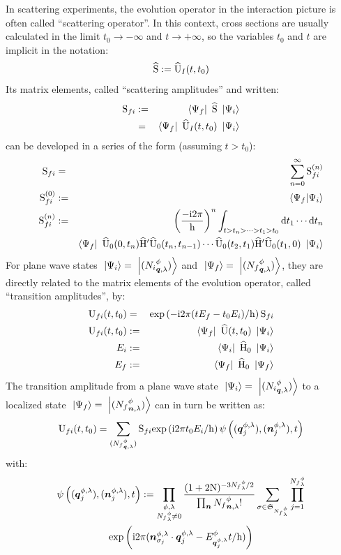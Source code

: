 \documentclass[10pt,a4paper,twoside,openany]{book}
\begin{document}
In scattering experiments, the evolution operator in the interaction picture is often called ``scattering operator''. In this context, cross sections are usually calculated in the limit $t_0 \to - \infty$ and $t \to + \infty$, so the variables $t_0$ and $t$ are implicit in the notation:
\begin{equation*}
\widehat{\mathrm S} := \widehat{\mathrm U}_I({t},{t_0})
\end{equation*}
Its matrix elements, called ``scattering amplitudes'' and written:
\begin{eqnarray*}
\mathrm S_{{f}{i}} & := & \left\langle{\Psi_f}\right|\  \widehat{\mathrm S} \ \left|{\Psi_i}\right\rangle \\
& = & \left\langle{\Psi_f}\right|\  \widehat{\mathrm U}_I({t},{t_0}) \ \left|{\Psi_i}\right\rangle
\end{eqnarray*}
can be developed in a series of the form (assuming $t > t_0$):
\begin{eqnarray*}
\mathrm S_{{f}{i}} & = & \sum_{n=0}^\infty \mathrm S_{{f}{i}}^{({n})} \\
\mathrm S_{{f}{i}}^{({0})} & := & \left\langle{\Psi_f}|{\Psi_i}\right\rangle \\
\mathrm S_{{f}{i}}^{({n})} & := & \left( \frac{-\mathrm{i} 2 \pi} {\mathrm h} \right)^n \int_{t > t_n > \dotsb > t_1 > t_0} \mathrm dt_1 \dotsm \mathrm dt_n \\
&& \left\langle{\Psi_f}\right|\  \widehat{\mathrm U}_0({0},{t_n}) \widehat{\mathrm H}' \widehat{\mathrm U}_0({t_n},{t_{n-1}}) \dotsm \widehat{\mathrm U}_0({t_2},{t_1}) \widehat{\mathrm H}' \widehat{\mathrm U}_0({t_1},{0}) \ \left|{\Psi_i}\right\rangle
\end{eqnarray*}
For plane wave states $\ \left|{\Psi_i}\right\rangle = \ \left|{({N_i}^{\phi}_{{\boldsymbol{q}}, {\lambda}})}\right\rangle$ and $\ \left|{\Psi_f}\right\rangle = \ \left|{({N_f}^{\phi}_{{\boldsymbol{q}}, {\lambda}})}\right\rangle$, they are directly related to the matrix elements of the evolution operator, called ``transition amplitudes'', by:
\begin{eqnarray*}
\mathrm U_{{f}{i}}({t},{t_0}) & = & \mathrm{exp} \left( {-\mathrm{i} 2 \pi ( t E_f - t_0 E_i ) / \mathrm h} \right) \mathrm S_{{f}{i}} \\
\mathrm U_{{f}{i}}({t},{t_0}) & := & \left\langle{\Psi_f}\right|\  \widehat{\mathrm U}({t},{t_0}) \ \left|{\Psi_i}\right\rangle \\
E_i & := & \left\langle{\Psi_i}\right|\  \widehat{\mathrm H}_0 \ \left|{\Psi_i}\right\rangle \\
E_f & := & \left\langle{\Psi_f}\right|\  \widehat{\mathrm H}_0 \ \left|{\Psi_f}\right\rangle
\end{eqnarray*}
The transition amplitude from a plane wave state $\ \left|{\Psi_i}\right\rangle = \ \left|{({N_i}^{\phi}_{{\boldsymbol{q}}, {\lambda}})}\right\rangle$ to a localized state $\ \left|{\Psi_f}\right\rangle = \ \left|{({N_f}^{\phi}_{{\boldsymbol{n}}, {\lambda}})}\right\rangle$ can in turn be written as:
\begin{equation*}
\mathrm U_{{f}{i}}({t},{t_0}) = \sum_{({N_f}^{\phi}_{{\boldsymbol{q}}, {\lambda}})} \mathrm S_{{f}{i}} \mathrm{exp} \left( {\mathrm{i} 2 \pi t_0 E_i / \mathrm h} \right) \psi \left( ( \boldsymbol{q}^{\phi, \lambda}_j ), ( \boldsymbol{n}^{\phi, \lambda}_j ), t \right)
\end{equation*}
with:
\begin{multline*}
\psi \left( ( \boldsymbol{q}^{\phi, \lambda}_j ), ( \boldsymbol{n}^{\phi, \lambda}_j ), t \right) := \prod_{\substack{\phi, \lambda \\ {N_f}^\phi_\lambda \neq 0}} \frac{(1+2 \mathrm N)^{-3 {N_f}^\phi_\lambda / 2} }{\prod_{\boldsymbol{n}} {N_f}^{\phi}_{{\boldsymbol{n}}, {\lambda}} !} \sum_{\sigma \in \mathfrak{S}_{{N_f}^\phi_\lambda}} \prod_{j = 1}^{{N_f}^\phi_\lambda} \\
\mathrm{exp} \left( {\mathrm{i} 2 \pi ( \boldsymbol{n}^{\phi, \lambda}_{\sigma_j} \cdot \boldsymbol{q}^{\phi, \lambda}_j - E^{\phi}_{\boldsymbol{q}^{\phi, \lambda}_j} t / \mathrm h )} \right)
\end{multline*}
\end{document}
